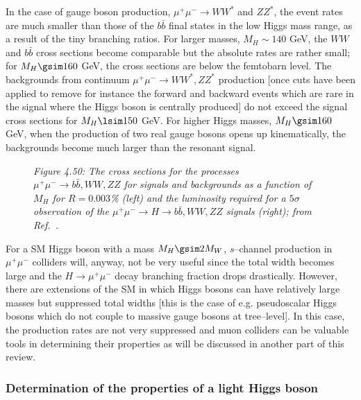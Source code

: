 In the case of gauge boson production, $\mu^+ \mu^- \to WW^*$ and $ZZ^*$, the 
event rates are much smaller than those of the $b\bar{b}$ final
states in the low Higgs mass range, as a result of the tiny branching ratios. 
For larger masses, $M_H \sim 140$ GeV, the $WW$ and $b\bar b$ cross sections
become comparable but the absolute rates are rather small;  for $M_H \gsim 160$
GeV, the cross sections are below the femtobarn level. The backgrounds from
continuum $\mu^+ \mu^- \to WW^*, ZZ^*$ production [once cuts have been applied
to remove for instance the forward and backward events which are rare in the
signal where the Higgs boson is centrally produced] do not exceed the signal
cross sections for $M_H \lsim 150$ GeV.  For higher Higgs masses, $M_H \gsim
160$ GeV, when the production of two real gauge bosons opens up kinematically,
the backgrounds become much larger than the resonant signal. \s

\begin{figure}[h]
\vspace*{-1mm}
\begin{center}
{}
\end{center}
\vspace*{-6mm}
{\it Figure 4.50: The cross sections for the processes $\mu^+\mu^-\to b\bar{b}, 
WW, ZZ$ for signals and backgrounds as a function of $M_H$ for $R=0.003$\%
(left) and the luminosity required for a $5\sigma$ observation of the 
$\mu^+\mu^-\to H \to b\bar{b}, WW, ZZ$ signals (right); from 
Ref.~\cite{mu-Rev1}.} 
\vspace*{-2mm}
\end{figure}

For a SM Higgs boson with a mass $M_H\gsim 2M_W$, $s$--channel production
in $\mu^+ \mu^-$ colliders will, anyway, not be very useful since the total
width becomes large and the $H \to \mu^+ \mu^-$ decay branching fraction
drops drastically.  However, there are extensions of the SM in which Higgs
bosons can have relatively large masses but suppressed total  widths [this is 
the case of e.g. pseudoscalar Higgs bosons which do not couple to 
massive gauge bosons at tree--level]. In this case, the production rates 
are not very suppressed and muon colliders can be valuable tools in 
determining their properties as will be discussed in another part of this 
review.  

\subsubsection{Determination of the properties of a light Higgs boson}

